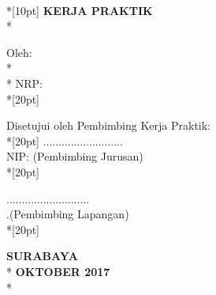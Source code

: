 \newpage
	\thispagestyle{plain}
	\begin{centering}
		\textbf{\MakeUppercase{\judul}} \\*[10pt]
		\textbf{\large{KERJA PRAKTIK}} \\*
		
		Oleh: \\*
		\textbf{\penulis} \\*
		NRP: \nrp \\*[20pt]
	\end{centering}

	{\noindent Disetujui oleh Pembimbing Kerja Praktik:}\\*[20pt]         
	\pembimbingJurusan \hfill \hfill .......................... \\
		NIP: \nipPembimbingSatu \hfill \hfill (Pembimbing Jurusan) \\*[20pt]
		
	{\noindent \pembimbingLapangan  \hfill \hfill ...........................}  \\
	.\hfill \hfill (Pembimbing Lapangan) \\*[20pt] 

	\begin{centering}
		\textbf{SURABAYA} \\*
		\textbf{OKTOBER 2017} \\*
	\end{centering}
	\cleardoublepage